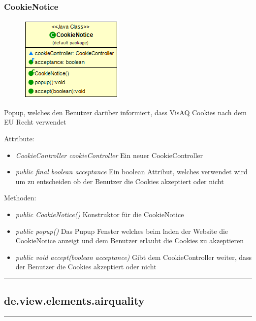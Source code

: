 \subsubsection{CookieNotice}
\begin{minipage}{0.3\textwidth}
    \begin{figure}[H]
        {\centering\includegraphics[scale = 0.5
        ]{media/view/CookieNotice_Class.png}}
    \end{figure}
    \end{minipage} \hfill
    \begin{minipage}{0.6\textwidth}
Popup, welches den Benutzer darüber informiert, dass VisAQ Cookies nach dem EU Recht verwendet
\end{minipage}
Attribute: \begin{itemize} [noitemsep]
     \item \emph{CookieController cookieController} Ein neuer CookieController
    \item \emph{public final boolean acceptance} Ein boolean Attribut, welches verwendet wird um zu entscheiden ob der Benutzer die Cookies akzeptiert oder nicht
\end{itemize}
Methoden: \begin{itemize} [noitemsep]
    \item \emph{public CookieNotice()} Konstruktor für die CookieNotice
    \item \emph{public popup()} Das Pupup Fenster welches beim laden der Website die CookieNotice anzeigt und dem Benutzer erlaubt die Cookies zu akzeptieren
    \item \emph{public void accept(boolean acceptance)} Gibt dem CookieController weiter, dass der Benutzer die Cookies akzeptiert oder nicht
\end{itemize}


\rule{\textwidth}{0.4pt}
\subsection{de.view.elements.airquality}

\rule{\textwidth}{0.4pt}
